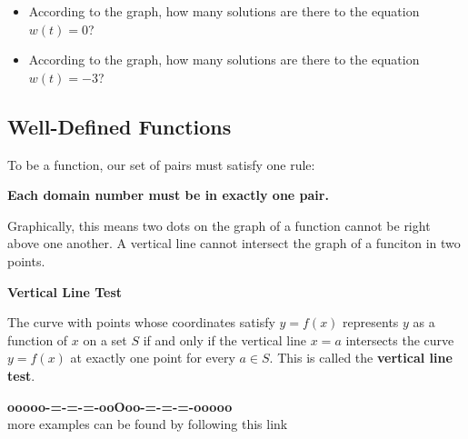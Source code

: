 \documentclass{ximera}
\begin{document}
\begin{question}
\begin{itemize}
 
\item According to the graph, how many solutions are there to the equation $w(t) = 0$?
\begin{multipleChoice}
\end{multipleChoice}


\item According to the graph, how many solutions are there to the equation $w(t) = -3$?
\begin{multipleChoice}
\end{multipleChoice}
\end{itemize}
\end{question}
















\subsection*{Well-Defined Functions}

To be a function, our set of pairs must satisfy one rule:

\begin{center}
\textbf{Each domain number must be in exactly one pair.}
\end{center}


Graphically, this means two dots on the graph of a function cannot be right above one another. A vertical line cannot intersect the graph of a funciton in two points. 



\begin{definition} \textbf{\textcolor{-red!75!green}{Vertical Line Test}}   


The curve with points whose coordinates satisfy $y=f(x)$ represents $y$ as a function of $x$ on a set $S$ if and only if the vertical line $x=a$ intersects the curve $y=f(x)$ at exactly one point for every $a \in S$. This is called the \textbf{vertical line test}.
\end{definition}











\begin{center}
\textbf{\textcolor{green!50!black}{ooooo-=-=-=-ooOoo-=-=-=-ooooo}} \\

more examples can be found by following this link\\ 

\end{center}
\end{document}
